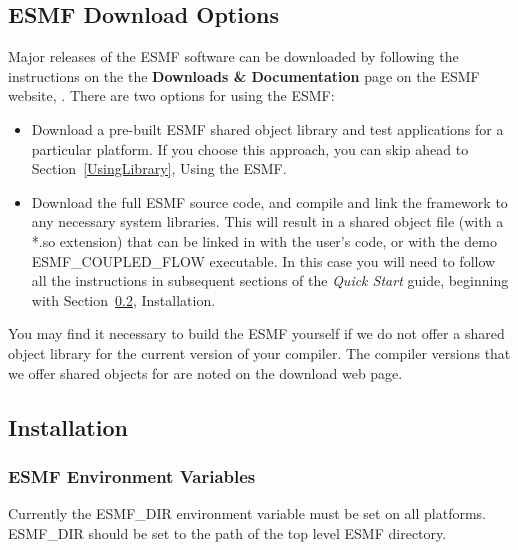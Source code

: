
\subsection{ESMF Download Options}

Major releases of the ESMF software can be downloaded by following
the instructions on the 
the {\bf Downloads \& Documentation} page on the ESMF 
website, .  There are two options for using the ESMF:

\begin{itemize}
\item Download a pre-built ESMF shared object library and
test applications for a particular platform.  If you choose
this approach, you can skip ahead to Section~\ref{UsingLibrary},
Using the ESMF.  
\item Download the full ESMF source code, and compile and link
the framework to any necessary system libraries.  This will
result in a shared object file (with a *.so extension)
that can be linked in with the user's code, or with the demo
{ESMF\_COUPLED\_FLOW} executable.  In this case you will need
to follow all the instructions in subsequent sections of the 
{\it Quick Start} guide, beginning with Section~\ref{InstallProcedures},
Installation.
\end{itemize}

You may find it necessary to build the ESMF yourself
if we do not offer a shared object library for the current
version of your compiler.  The compiler versions that we offer
shared objects for are noted on the download web page.

\subsection{Installation}
\label{InstallProcedures}



\subsubsection{ESMF Environment Variables}

Currently the ESMF\_DIR environment variable must be set on all
platforms.  ESMF\_DIR should be set to the path of the top
level ESMF directory.  


